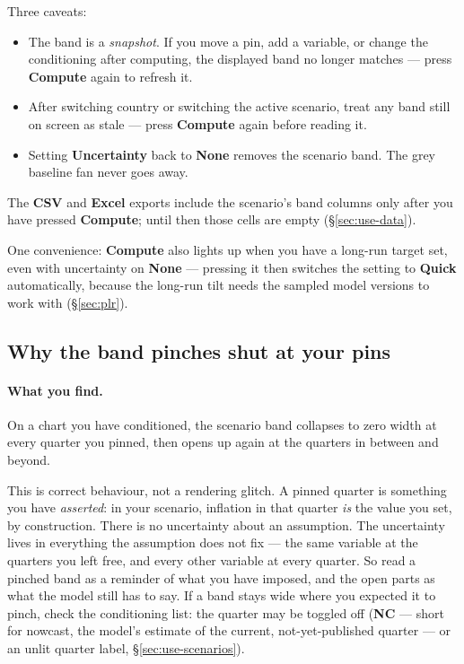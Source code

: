 \documentclass[11pt]{article}
\theoremstyle{definition}
\theoremstyle{remark}
\begin{document}
Three caveats:
\begin{itemize}
  \item The band is a \emph{snapshot}. If you move a pin, add a variable, or change
    the conditioning after computing, the displayed band no longer matches --- press
    \textbf{Compute} again to refresh it.
  \item After switching country or switching the active scenario, treat any band still
    on screen as stale --- press \textbf{Compute} again before reading it.
  \item Setting \textbf{Uncertainty} back to \textbf{None} removes the scenario band.
    The grey baseline fan never goes away.
\end{itemize}
The \textbf{CSV} and \textbf{Excel} exports include the scenario's band columns only
after you have pressed \textbf{Compute}; until then those cells are empty
(\S\ref{sec:use-data}).

One convenience: \textbf{Compute} also lights up when you have a long-run target set,
even with uncertainty on \textbf{None} --- pressing it then switches the setting to
\textbf{Quick} automatically, because the long-run tilt needs the sampled model
versions to work with (\S\ref{sec:plr}).

\subsection{Why the band pinches shut at your pins}

\paragraph{What you find.} On a chart you have conditioned, the scenario band collapses
to zero width at every quarter you pinned, then opens up again at the quarters in
between and beyond.

This is correct behaviour, not a rendering glitch. A pinned quarter is something you
have \emph{asserted}: in your scenario, inflation in that quarter \emph{is} the value
you set, by construction. There is no uncertainty about an assumption. The uncertainty
lives in everything the assumption does not fix --- the same variable at the quarters
you left free, and every other variable at every quarter. So read a pinched band as a
reminder of what you have imposed, and the open parts as what the model still has to
say. If a band stays wide where you expected it to pinch, check the conditioning list:
the quarter may be toggled off (\textbf{NC} --- short for nowcast, the model's estimate
of the current, not-yet-published quarter --- or an unlit quarter label,
\S\ref{sec:use-scenarios}).
\end{document}
